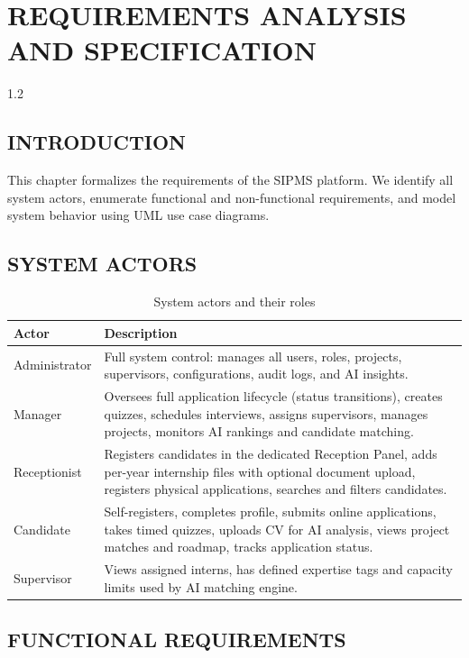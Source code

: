 \chapter{REQUIREMENTS ANALYSIS AND SPECIFICATION}
\begin{spacing}{1.2}
\minitoc
\thispagestyle{MyStyle}
\end{spacing}
\newpage

\section{INTRODUCTION}
This chapter formalizes the requirements of the SIPMS platform. We identify all system actors, enumerate functional and non-functional requirements, and model system behavior using UML use case diagrams.

\section{SYSTEM ACTORS}

\begin{table}[H]
\centering
\begin{tabular}{|p{3.5cm}|p{9.5cm}|}
\hline
\rowcolor{gray!20}
\textbf{Actor} & \textbf{Description} \\
\hline
Administrator & Full system control: manages all users, roles, projects, supervisors, configurations, audit logs, and AI insights. \\
\hline
Manager & Oversees full application lifecycle (status transitions), creates quizzes, schedules interviews, assigns supervisors, manages projects, monitors AI rankings and candidate matching. \\
\hline
Receptionist & Registers candidates in the dedicated Reception Panel, adds per-year internship files with optional document upload, registers physical applications, searches and filters candidates. \\
\hline
Candidate & Self-registers, completes profile, submits online applications, takes timed quizzes, uploads CV for AI analysis, views project matches and roadmap, tracks application status. \\
\hline
Supervisor & Views assigned interns, has defined expertise tags and capacity limits used by AI matching engine. \\
\hline
\end{tabular}
\caption{System actors and their roles}
\end{table}

\section{FUNCTIONAL REQUIREMENTS}

